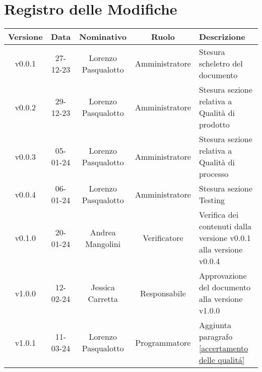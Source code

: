 \section*{\Large Registro delle Modifiche}
    \begin{table}[h]
        \centering
        \renewcommand\tabularxcolumn[1]{m{#1}} %
        \renewcommand{\arraystretch}{1.5}
        \begin{tabularx}{0.98\textwidth}
            {c|c|c|c|>{\centering\arraybackslash}X}
            \rowcolor{black}
            \textbf{\color{white} Versione} & \textbf{\color{white} Data} & \textbf{\color{white} Nominativo} & \textbf{\color{white} Ruolo} & \textbf{\color{white} Descrizione} \\ 
            \hline

            v0.0.1 & 27-12-23 & Lorenzo Pasqualotto & Amministratore & Stesura scheletro del documento \\

            v0.0.2 & 29-12-23 & Lorenzo Pasqualotto & Amministratore & Stesura sezione relativa a Qualità di prodotto\\

            v0.0.3 & 05-01-24 & Lorenzo Pasqualotto & Amministratore & Stesura sezione relativa a Qualità di processo\\

            v0.0.4 & 06-01-24 & Lorenzo Pasqualotto & Amministratore & Stesura sezione Testing\\

            v0.1.0 & 20-01-24 & Andrea Mangolini & Verificatore & Verifica dei contenuti dalla versione v0.0.1 alla versione v0.0.4\\

            v1.0.0 & 12-02-24 & Jessica Carretta & Responsabile & Approvazione del documento alla versione v1.0.0\\

            v1.0.1 & 11-03-24 & Lorenzo Pasqualotto & Programmatore & Aggiunta paragrafo \ref{accertamento delle qualitá}\\
            \hline
        \end{tabularx}
    \end{table}
